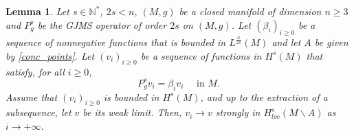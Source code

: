 \documentclass[10pt]{amsart}
\numberwithin{equation}{section}
\def\be{{\beta}}
\theoremstyle{plain}
\newtheorem{lemme}{Lemma}[section]%
\theoremstyle{remark}
\begin{document}
\begin{lemme} \label{convergence_appendix}
Let $s \in \mathbb{N}^*$, $2s <n$, $(M,g)$ be a closed manifold of dimension $n \ge 3$ and $P_g^s$ be the GJMS operator of order $2s$ on $(M,g)$. Let $(\be_i)_{i \ge0}$ be a sequence of nonnegative functions that is bounded in $L^{\frac{n}{2s}}(M)$ and let $A$ be given by \eqref{conc_points}. Let $(v_i)_{i \ge0}$ be a sequence of functions in $H^s(M)$ that satisfy, for all $i \ge 0$, 
\begin{equation} \label{eqvk}
P_g^s  v_i = \be_i  v_i  \quad \text{ in } M. 
\end{equation}
Assume that $(v_i)_{i \ge0}$ is bounded in $H^s(M)$, and up to the extraction of a subsequence, let $v$ be its weak limit. Then, $v_i \to v$ strongly in $H^s_{loc}(M \backslash A)$ as $i \to + \infty$. 
\end{lemme}
\end{document}
